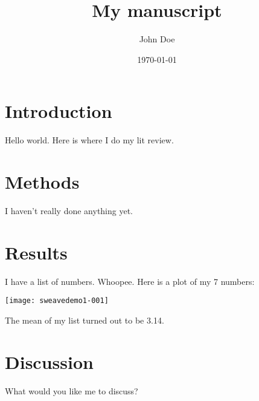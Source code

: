 \documentclass{article}
\title{My manuscript}
\author{John Doe}
\date{\today}
\begin{document}
\maketitle


\section*{Introduction}

Hello world. Here is where I do my lit review.

\section*{Methods}

I haven't really done anything yet.

\section*{Results}

I have a list of numbers. Whoopee. Here is a plot of my 7 numbers:

\texttt{[image: sweavedemo1-001]}

The mean of my list turned out to be 3.14.

\section*{Discussion}

What would you like me to discuss?
\end{document}
